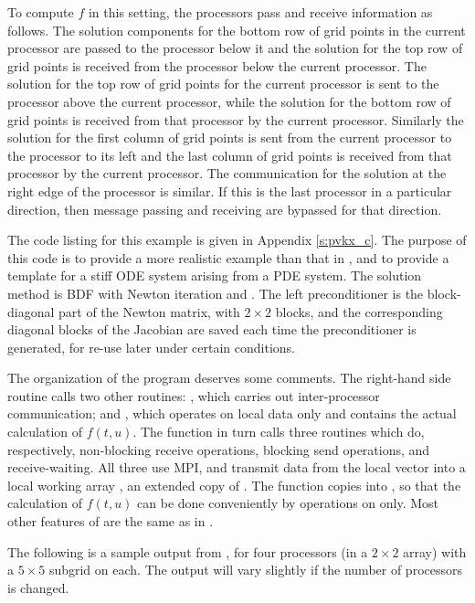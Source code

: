 To compute $f$ in this setting, the processors pass and receive
information as follows.  The solution components for the bottom row of
grid points in the current processor are passed to the processor below
it and the solution for the top row of grid points is received from
the processor below the current processor. The solution for the top
row of grid points for the current processor is sent to the processor
above the current processor, while the solution for the bottom row of
grid points is received from that processor by the current
processor. Similarly the solution for the first column of grid points
is sent from the current processor to the processor to its left and
the last column of grid points is received from that processor by the
current processor. The communication for the solution at the right
edge of the processor is similar. If this is the last processor in a
particular direction, then message passing and receiving are bypassed
for that direction.

The code listing for this example is given in Appendix \ref{s:pvkx_c}.
The purpose of this code is to provide a more realistic example than
that in , and to provide a template for a stiff ODE system
arising from a PDE system. The solution method is BDF with Newton
iteration and {\spgmr}. The left preconditioner is the block-diagonal
part of the Newton matrix, with $2 \times 2$ blocks, and the
corresponding diagonal blocks of the Jacobian are saved each time the
preconditioner is generated, for re-use later under certain conditions.

The organization of the  program deserves some comments. The
right-hand side routine  calls two other routines: , which
carries out inter-processor communication; and , which operates on
local data only and contains the actual calculation of $f(t,u)$. The 
 function in turn calls three routines which do, respectively,
non-blocking receive operations, blocking send operations, and
receive-waiting. All three use MPI, and transmit data from the local 
vector into a local working array , an extended copy of .
The  function copies  into , so that the
calculation of $f(t,u)$ can be done conveniently by operations on 
 only.  Most other features of  are the same as in
.

The following is a sample output from , for four processors
(in a $2 \times 2$ array) with a $5 \times 5$ subgrid on each.
The output will vary slightly if the number of processors is changed.

